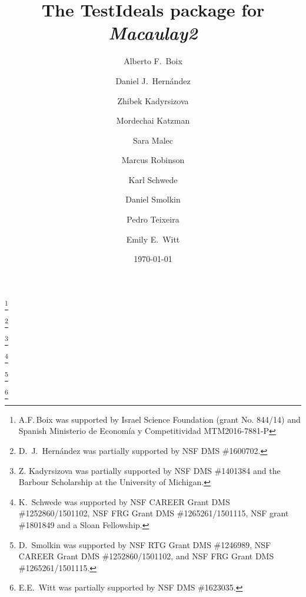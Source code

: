 \documentclass{amsart}
\begin{document}
\title{The  {TestIdeals} package for \emph{Macaulay2}}
\author[Alberto F.\ Boix et al.]{Alberto F.\ Boix}
\address{Department of Mathematics, Ben-Gurion University of the Negev, Beer-Sheva 8410501, Israel}
\thanks{A.F.\,Boix was supported by Israel Science Foundation (grant No. 844/14) and Spanish Ministerio de Econom\'ia y Competitividad MTM2016-7881-P}

\author[]{Daniel J.\ Hern\'andez}
\address{Department of Mathematics, University of Kansas, Lawrence, KS~66045, USA}
\thanks{D.~J.~Hern\'andez was partially supported by NSF DMS \#1600702.}

\author[]{Zhibek Kadyrsizova}
\address{School of Science and Technology, Nazarbayev University, Astana, 010000, Republic of Kazakhstan}
\thanks{Z. Kadyrsizova was partially supported by NSF DMS \#1401384 and the Barbour Scholarship at the University of Michigan.}

\author[]{Mordechai Katzman}
\address{Department of Pure Mathematics, University of Sheffield, Sheffield S37RH, United Kingdom}

\author[]{Sara Malec}
\address{Department of Mathematics, Hood College, Frederick, MD 21701}

\author[]{Marcus Robinson}
\address{Department of Mathematics, University of Utah, Salt Lake City, UT~84112, USA}

\author[]{Karl Schwede}
\address{Department of Mathematics, University of Utah, Salt Lake City, UT~84112, USA}
\thanks{K.~Schwede was supported by NSF CAREER Grant DMS \#1252860/1501102, NSF FRG Grant DMS \#1265261/1501115, NSF grant \#1801849 and a Sloan Fellowship.}

\author[]{Daniel Smolkin}
\address{Department of Mathematics, University of Utah, Salt Lake City, UT~84112, USA}
\thanks{D.~Smolkin was supported by NSF RTG Grant DMS \#1246989, NSF CAREER Grant DMS \#1252860/1501102, and NSF FRG Grant DMS \#1265261/1501115.}

\author[]{Pedro Teixeira}
\address{Department of Mathematics, Knox College, Galesburg, IL~61401, USA}

\author[]{Emily E.\ Witt}
\address{Department of Mathematics, University of Kansas, Lawrence, KS~66045, USA}
\thanks{E.E.~Witt was partially supported by NSF DMS \#1623035.}
\date{\today}
\end{document}
